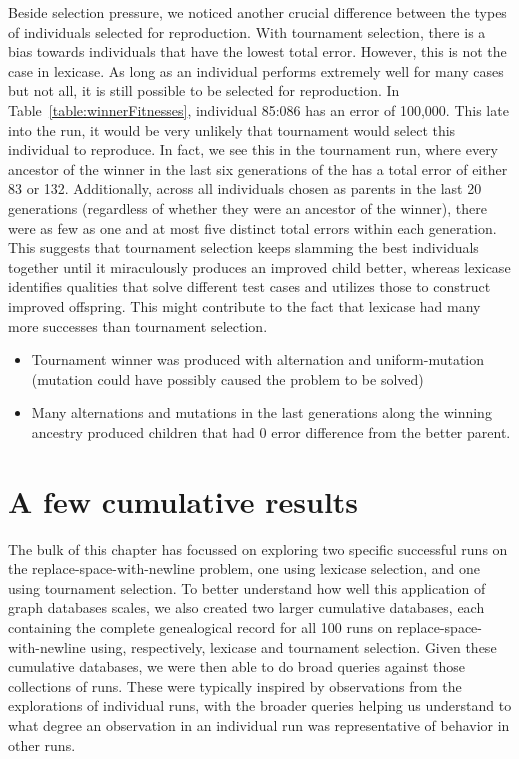 Beside selection pressure, we noticed another crucial difference between the types of individuals 
selected for reproduction. With tournament selection, there is a bias towards individuals that 
have the lowest total error. However, this is not the case in lexicase.  As long as an individual 
performs extremely well for many cases but not all, it is still possible to be selected for 
reproduction. In Table~\ref{table:winnerFitnesses}, individual 85:086 has an error of 100,000. 
This late into the run, it would be very unlikely that tournament would select this individual to 
reproduce. In fact, we see this in the tournament run, where every ancestor of the winner in the
last six generations of the
has a total error of either 83 or 132. Additionally, across all individuals chosen
as parents in the last 20 generations (regardless of whether they were an ancestor of the winner), 
there were as few as one and at most five distinct total errors within each generation. 
This suggests that tournament selection keeps
slamming the best individuals together until it miraculously produces an improved child better, whereas 
lexicase identifies qualities that solve different test cases and utilizes those 
to construct improved offspring. This might contribute to the fact that lexicase had many more 
successes than tournament selection.

\begin{itemize}
	\item Tournament winner was produced with alternation and uniform-mutation (mutation could have possibly caused the problem to be solved)
	\item Many alternations and mutations in the last generations along the winning ancestry produced children that had 0 error difference from the better parent. 
\end{itemize}





\section{A few cumulative results}
\label{sec:cumulativeResults}

The bulk of this chapter has focussed on exploring two specific successful runs on the replace-space-with-newline problem,
one using lexicase selection, and one using tournament selection. To better understand how well this application of graph
databases scales, we also created two larger cumulative databases, each containing the complete genealogical record for all 
100 runs on replace-space-with-newline using, respectively, lexicase and tournament selection. Given these cumulative 
databases, we were then able to do broad queries against those collections of runs. These were typically inspired by 
observations from the explorations of individual runs, with the broader queries helping us understand to what degree an 
observation in an individual run was representative of behavior in other runs.

